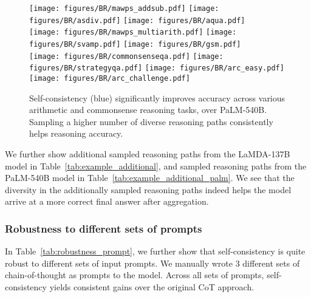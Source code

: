 \begin{figure}[h]
\centering
\texttt{[image: figures/BR/mawps\_addsub.pdf]}
\texttt{[image: figures/BR/asdiv.pdf]}
\texttt{[image: figures/BR/aqua.pdf]}\\
\texttt{[image: figures/BR/mawps\_multiarith.pdf]}
    \texttt{[image: figures/BR/svamp.pdf]}
    \texttt{[image: figures/BR/gsm.pdf]}\\
    \hspace{-0.2in}
    \texttt{[image: figures/BR/commonsenseqa.pdf]}
    \hspace{-0.1in}
    \texttt{[image: figures/BR/strategyqa.pdf]}
    \hspace{-0.1in}
    \texttt{[image: figures/BR/arc\_easy.pdf]}
    \hspace{-0.1in}
    \texttt{[image: figures/BR/arc\_challenge.pdf]}
    \hspace{-0.2in}
    \vspace{-0.1in}
    \caption{Self-consistency (blue) significantly improves accuracy across various arithmetic and commonsense reasoning tasks, over PaLM-540B. Sampling a higher number of diverse reasoning paths consistently helps reasoning accuracy.}
    \label{fig:exp_results_palm}
\end{figure}



We further show additional sampled reasoning paths from the LaMDA-137B model in Table~\ref{tab:example_additional}, and sampled reasoning paths from the PaLM-540B model in Table~\ref{tab:example_additional_palm}.
We see that the diversity in the additionally sampled reasoning paths indeed helps the model arrive at a more correct final answer after aggregation.




\subsubsection{Robustness to different sets of prompts}
\label{sec:robustness_diff_prompts}
In Table~\ref{tab:robustness_prompt}, we further show that self-consistency is quite robust to different sets of input prompts. We manually wrote 3 different sets of chain-of-thought as prompts to the model. Across all sets of prompts, self-consistency yields consistent gains over the original CoT approach.

